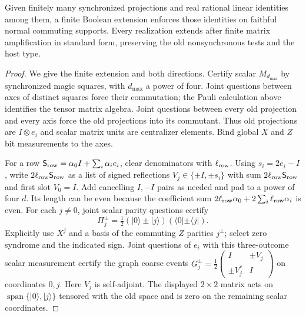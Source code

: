 \begin{lemma}\label{lem:rows}
Given finitely many synchronized projections and real rational linear
identities among them, a finite Boolean extension enforces those
identities on faithful normal commuting supports. Every realization
extends after finite matrix amplification in standard form, preserving
the old nonsynchronous tests and the host type.
\end{lemma}
\begin{proof}
We give the finite extension and both directions.
Certify scalar $M_{d_{\max}}$ by synchronized magic squares, with
$d_{\max}$ a power of four. Joint questions between axes of distinct
squares force their commutation; the Pauli calculation above identifies
the tensor matrix algebra. Joint questions between every old projection
and every axis force the old projections into its commutant.
Thus old projections are $I\otimes e_i$ and scalar matrix units are
centralizer elements. Bind global $X$ and $Z$ bit measurements to the axes.

For a row $\mathsf S_{\rm row}=\alpha_0I+\sum_i\alpha_i e_i$, clear denominators with $\ell_{\rm row}$.
Using $s_i=2e_i-I$, write $2\ell_{\rm row}\mathsf S_{\rm row}$ as a list of signed reflections
$V_j\in\{\pm I,\pm s_i\}$ with sum $2\ell_{\rm row}\mathsf S_{\rm row}$ and first slot $V_0=I$.
Add cancelling $I,-I$ pairs as needed and pad to a power of four $d$.
Its length can be even because the coefficient sum
$2\ell_{\rm row}\alpha_0+2\sum_i\ell_{\rm row}\alpha_i$ is even.
For each $j\ne0$, joint scalar parity questions certify
\[
 \Pi_j^\pm=\tfrac12(|0\rangle\pm|j\rangle)
                 (\langle0|\pm\langle j|).
\]
Explicitly use $X^j$ and a basis of the commuting $Z$ parities
$j^\perp$; select zero syndrome and the indicated sign.
Joint questions of $e_i$ with this three-outcome scalar measurement
certify the graph coarse events
$G_j^\pm=\frac12\left(\begin{smallmatrix}I&\pm V_j\\
\pm V_j^*&I\end{smallmatrix}\right)$ on coordinates $0,j$.
Here $V_j$ is self-adjoint. The displayed $2\times2$ matrix acts
on $\operatorname{span}\{|0\rangle,|j\rangle\}$ tensored with the
old space and is zero on the remaining scalar coordinates.


\end{proof}
